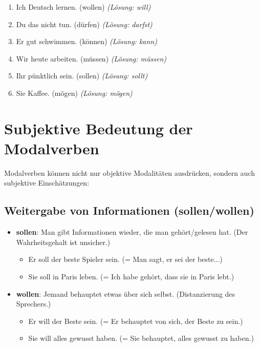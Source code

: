 \begin{enumerate}
    \item Ich \underline{\hspace{1cm}} Deutsch lernen. (wollen) \quad \textit{(Lösung: will)}
    \item Du \underline{\hspace{1cm}} das nicht tun. (dürfen) \quad \textit{(Lösung: darfst)}
    \item Er \underline{\hspace{1cm}} gut schwimmen. (können) \quad \textit{(Lösung: kann)}
    \item Wir \underline{\hspace{1cm}} heute arbeiten. (müssen) \quad \textit{(Lösung: müssen)}
    \item Ihr \underline{\hspace{1cm}} pünktlich sein. (sollen) \quad \textit{(Lösung: sollt)}
    \item Sie \underline{\hspace{1cm}} Kaffee. (mögen) \quad \textit{(Lösung: mögen)}
\end{enumerate}

\section{Subjektive Bedeutung der Modalverben}
\label{sec:SubjektiveModalverben}

Modalverben können nicht nur objektive Modalitäten ausdrücken, sondern auch subjektive Einschätzungen:

\subsection{Weitergabe von Informationen (sollen/wollen)}
\begin{itemize}
    \item \textbf{sollen}: Man gibt Informationen wieder, die man gehört/gelesen hat. (Der Wahrheitsgehalt ist unsicher.)
        \begin{itemize}
            \item Er soll der beste Spieler sein. (= Man sagt, er sei der beste...)
            \item Sie soll in Paris leben. (= Ich habe gehört, dass sie in Paris lebt.)
        \end{itemize}
    \item \textbf{wollen}: Jemand behauptet etwas über sich selbst. (Distanzierung des Sprechers.)
        \begin{itemize}
            \item Er will der Beste sein. (= Er behauptet von sich, der Beste zu sein.)
            \item Sie will alles gewusst haben. (= Sie behauptet, alles gewusst zu haben.)
        \end{itemize}
\end{itemize}

